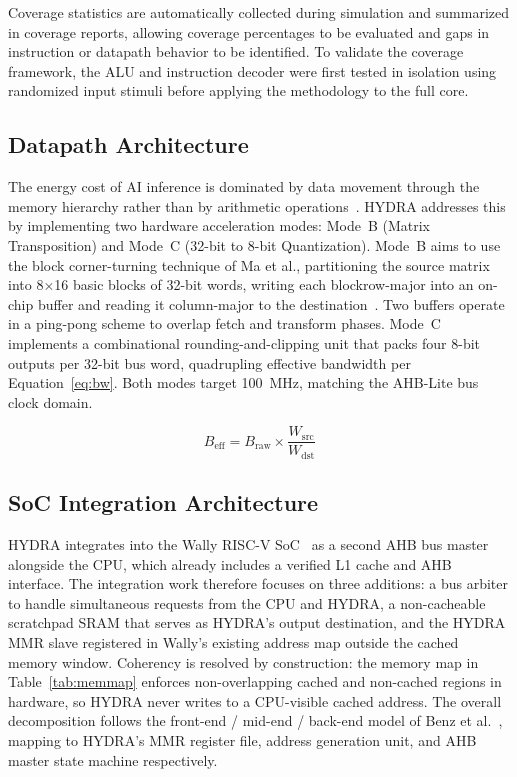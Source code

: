 \documentclass[conference]{IEEEtran}
\begin{document}
Coverage statistics are automatically collected during simulation and summarized in coverage reports, allowing coverage percentages to be evaluated and gaps in instruction or datapath behavior to be identified. To validate the coverage framework, the ALU and instruction decoder were first tested in isolation using randomized input stimuli before applying the methodology to the full core.

\subsection{Datapath Architecture}
The energy cost of AI inference is dominated by data movement through the
memory hierarchy rather than by arithmetic operations~\cite{tripp2024}. HYDRA addresses this by implementing two hardware acceleration modes: Mode~B (Matrix Transposition) and Mode~C (32-bit to 8-bit Quantization). Mode~B aims to use the block corner-turning technique of Ma et al., partitioning the source matrix into 8$\times$16 basic blocks of 32-bit words, writing each blockrow-major into an on-chip buffer and reading it column-major to the destination~\cite{ma2019}. Two buffers operate in a ping-pong scheme to overlap fetch and transform phases. Mode~C implements a combinational rounding-and-clipping unit that packs four 8-bit outputs per 32-bit bus word, quadrupling effective bandwidth per Equation~\ref{eq:bw}. Both modes target 100~MHz, matching the AHB-Lite bus clock domain.

\begin{equation}
    B_{\text{eff}} = B_{\text{raw}} \times \frac{W_{\text{src}}}{W_{\text{dst}}}
    \label{eq:bw}
\end{equation}

\subsection{SoC Integration Architecture}
HYDRA integrates into the Wally RISC-V SoC~\cite{harris2022wally} as a second AHB bus master alongside the CPU, which already includes a verified L1 cache and AHB interface. The integration work therefore focuses on three additions: a bus arbiter to handle simultaneous requests from the CPU and HYDRA, a non-cacheable scratchpad SRAM that serves as HYDRA's output destination, and the HYDRA MMR slave registered in Wally's existing address map outside the cached memory window. Coherency is resolved by construction: the memory map in Table~\ref{tab:memmap} enforces non-overlapping cached and non-cached regions in hardware, so HYDRA never writes to a CPU-visible cached address. The overall decomposition follows the front-end / mid-end / back-end model of Benz et al.~\cite{benz2023}, mapping to HYDRA's MMR register file, address generation unit, and AHB master state machine respectively.
\end{document}
